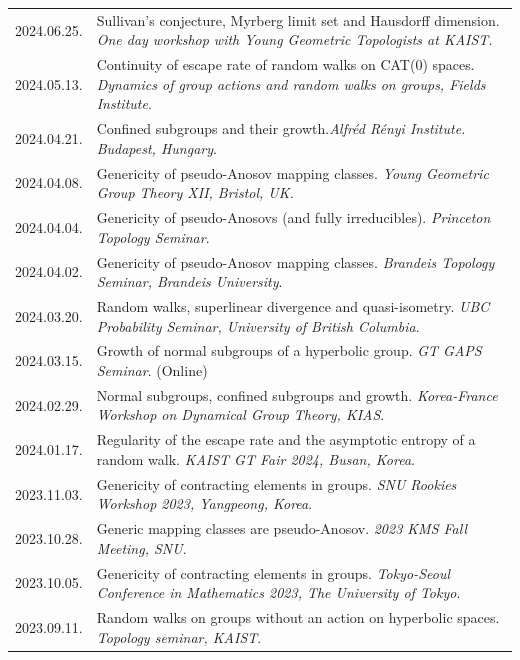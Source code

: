 \documentclass[a4paper, 10pt]{article}
\begin{document}
\begin{tabular}{Q{2.45cm}P{13cm}}
\small{2024.06.25.} &Sullivan’s conjecture, Myrberg limit set and Hausdorff dimension. \textit{One day workshop with Young Geometric Topologists at KAIST.}\\
\small{2024.05.13.} &  Continuity of escape rate of random walks on CAT(0) spaces. \textit{Dynamics of group actions and random walks on groups, Fields Institute}. \\
\small{2024.04.21.} & Confined subgroups and their growth.\textit{Alfréd Rényi Institute. Budapest, Hungary}.\\
\small{2024.04.08.} & Genericity of pseudo-Anosov mapping classes. \textit{Young Geometric Group Theory XII, Bristol, UK.} \\
\small{2024.04.04.} & Genericity of pseudo-Anosovs (and fully irreducibles). \textit{Princeton Topology Seminar}.\\
\small{2024.04.02.} & Genericity of pseudo-Anosov mapping classes. \textit{Brandeis Topology Seminar, Brandeis University}.\\
\small{2024.03.20.} & Random walks, superlinear divergence and quasi-isometry. \textit{UBC Probability Seminar, University of British Columbia}.\\
\small{2024.03.15.} & Growth of normal subgroups of a hyperbolic group. \textit{GT GAPS Seminar}. (Online)\\
\small{2024.02.29.} & Normal subgroups, confined subgroups and growth. \textit{Korea-France Workshop on Dynamical Group Theory, KIAS}.\\
\small{2024.01.17.} & Regularity of the escape rate and the asymptotic entropy of a random walk. \textit{KAIST GT Fair 2024, Busan, Korea}.\\
\small{2023.11.03.} & Genericity of contracting elements in groups. \textit{SNU Rookies Workshop 2023, Yangpeong, Korea}.\\
\small{2023.10.28.} & Generic mapping classes are pseudo-Anosov. \textit{2023 KMS Fall Meeting, SNU}.\\
\small{2023.10.05.} & Genericity of contracting elements in groups. \textit{Tokyo-Seoul Conference in Mathematics 2023, The University of Tokyo}.\\
\small{2023.09.11.} & Random walks on groups without an action on hyperbolic spaces. \textit{Topology seminar, KAIST}. \\
\end{tabular}
\end{document}

